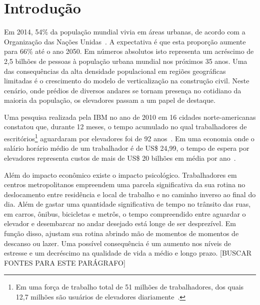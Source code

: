\chapter{\label{chap:intro}Introdução}

Em 2014, 54\% da população mundial vivia em áreas urbanas, de acordo com a Organização das Nações Unidas~\cite{UN14}. A expectativa é que esta proporção aumente para 66\% até o ano 2050. Em números absolutos isto representa um acréscimo de 2,5 bilhões de pessoas à população urbana mundial nos próximos 35 anos. Uma das consequências da alta densidade populacional em regiões geográficas limitadas é o crescimento do modelo de verticalização na construção civil. Neste cenário, onde prédios de diversos andares se tornam presença no cotidiano da maioria da população, os elevadores passam a um papel de destaque.

Uma pesquisa realizada pela IBM no ano de 2010 em 16 cidades norte-americanas constatou que, durante 12 meses, o tempo acumulado no qual trabalhadores de escritórios\footnote{Em uma força de trabalho total de 51 milhões de trabalhadores, dos quais 12,7 milhões são usuários de elevadores diariamente~\cite{IBM10}.} aguardaram por elevadores foi de 92 anos~\cite{IBM10}. Em uma economia onde o salário horário médio de um trabalhador é de US\$ 24,99, o tempo de espera por elevadores representa custos de mais de US\$ 20 bilhões em média por ano~\cite{BLS15}.

Além do impacto econômico existe o impacto psicológico. Trabalhadores em centros metropolitanos empreendem uma parcela significativa da sua rotina no deslocamento entre residência e local de trabalho e no caminho inverso ao final do dia. Além de gastar uma quantidade significativa de tempo no trânsito das ruas, em carros, ônibus, bicicletas e metrôs, o tempo compreendido entre aguardar o elevador e desembarcar no andar desejado está longe de ser desprezível. Em função disso, ajustam sua rotina abrindo mão de momentos de momentos de descanso ou lazer. Uma possível consequência é um aumento nos níveis de estresse e um decréscimo na qualidade de vida a médio e longo prazo. {\color{red}[BUSCAR FONTES PARA ESTE PARÁGRAFO]} %

